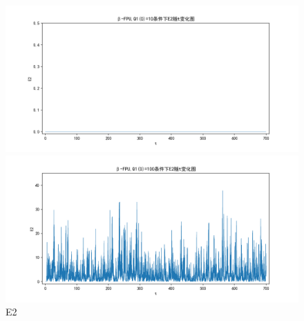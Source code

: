 \documentclass[10pt, a4paper]{article}
\begin{document}
    \begin{figure}[H]
        \begin{minipage}[t]{0.49\textwidth}
            \centering
            \includegraphics[width=\textwidth]{./q6_pics/cmp/E2.png}
        \end{minipage}
        \begin{minipage}[t]{0.49\textwidth}
            \centering
            \includegraphics[width=\textwidth]{./q6_pics/exp/E2.png}
        \end{minipage}
        \caption{E2}\label{fig:E2 in q6}
    \end{figure}
\end{document}
